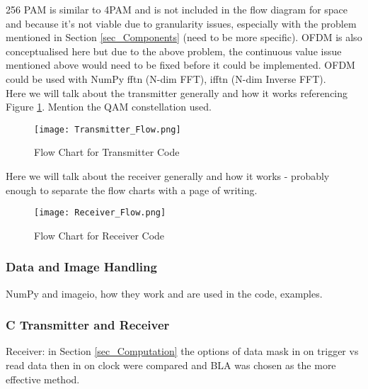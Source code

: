 \documentclass[../main.tex]{subfiles}
\begin{document}
256 PAM is similar to 4PAM and is not included in the flow diagram for space and because it's not viable due to granularity issues, especially with the problem mentioned in Section \ref{sec_Components} (need to be more specific).
OFDM is also conceptualised here but due to the above problem, the continuous value issue mentioned above would need to be fixed before it could be implemented.
OFDM could be used with NumPy fftn (N-dim FFT), ifftn (N-dim Inverse FFT).\\

Here we will talk about the transmitter generally and how it works referencing Figure \ref{fig_Transmitter_Flow}.
Mention the QAM constellation used.\\

\begin{figure}[ht]
	\centering
	\texttt{[image: Transmitter\_Flow.png]}
	\caption{Flow Chart for Transmitter Code}
	\label{fig_Transmitter_Flow}
\end{figure}

Here we will talk about the receiver generally and how it works - probably enough to separate the flow charts with a page of writing.\\

\begin{figure}[ht]
	\centering
	\texttt{[image: Receiver\_Flow.png]}
	\caption{Flow Chart for Receiver Code}
	\label{fig_Receiver_Flow}
\end{figure}

\subsubsection{Data and Image Handling}

NumPy and imageio, how they work and are used in the code, examples.\\

\subsubsection{C Transmitter and Receiver}

Receiver: in Section \ref{sec_Computation} the options of data mask in on trigger vs read data then in on clock were compared and BLA was chosen as the more effective method.
\end{document}
